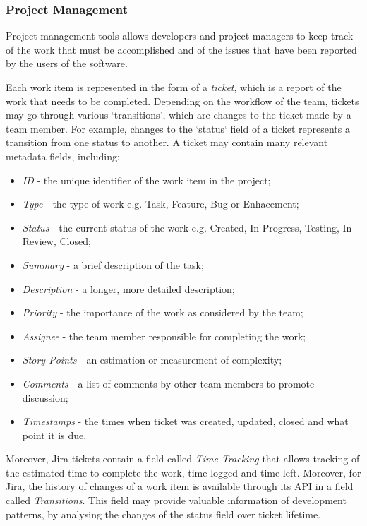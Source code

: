 \documentclass{mpaper}
\begin{document}
\subsubsection*{Project Management}
\label{project-management}

Project management tools allows developers and project managers to keep track of
the work that must be accomplished and of the issues that have been reported by
the users of the software. 

Each work item is represented in the form of a \emph{ticket}, which is a report
of the work that needs to be completed. Depending on the workflow of the team,
tickets may go through various `transitions', which are changes to the ticket
made by a team member. For example, changes to the `status` field of a ticket
represents a transition from one status to another. A ticket may contain many
relevant metadata fields, including:

\begin{itemize}
  \item \emph{ID} - the unique identifier of the work item in the project;
  \item \emph{Type} - the type of work e.g. Task, Feature, Bug or Enhacement;
  \item \emph{Status} - the current status of the work e.g. Created, In
  Progress, Testing, In Review, Closed;
  \item \emph{Summary} - a brief description of the task;
  \item \emph{Description} - a longer, more detailed description;
  \item \emph{Priority} - the importance of the work as considered by the team;
  \item \emph{Assignee} - the team member responsible for completing the work;
  \item \emph{Story Points} - an estimation or measurement of complexity;
  \item \emph{Comments} - a list of comments by other team members to promote
  discussion;
  \item \emph{Timestamps} - the times when ticket was created, updated, closed
  and what point it is due.
\end{itemize}

Moreover, Jira tickets contain a field called \emph{Time Tracking} that
allows tracking of the estimated time to complete the work, time logged and time
left. Moreover, for Jira, the history of changes of a work item is available
through its API in a field called \emph{Transitions}. This field may provide
valuable information of development patterns, by analysing the changes of the
status field over ticket lifetime. 
\end{document}
